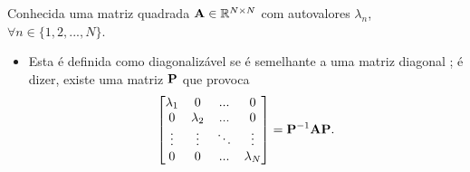\begin{definition}\label{def:diagonalization0}
Conhecida uma matriz quadrada $\MATRIX{A} \in \mathbb{R}^{N \times N}$ com
autovalores $\lambda_n$, $\forall n \in \{1, 2, ..., N\}$.
\begin{itemize}
\item Esta é definida como diagonalizável se é semelhante a uma matriz diagonal \cite[pp. 67]{golub2013matrix};
é dizer, existe uma matriz $\MATRIX{P}$ que provoca
\begin{equation}
\begin{bmatrix}
\lambda_1 & 0         & ...    & 0 \\
0         & \lambda_2 & ...    & 0 \\
\vdots    & \vdots    & \ddots & \vdots \\
0         & 0         & ...    & \lambda_N
\end{bmatrix}
=\MATRIX{P}^{-1}\MATRIX{A}\MATRIX{P}.
\end{equation}
\end{itemize}
\end{definition}

~

